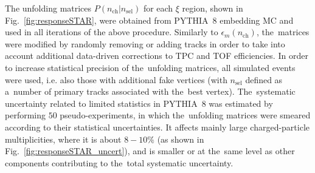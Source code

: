 The  unfolding matrices $P(n_\textrm{ch}|n_\textrm{sel})$  for each $\xi$ region, shown in Fig.~\ref{fig:responseSTAR}, were obtained from PYTHIA~8 embedding MC and used in all iterations of the above procedure. Similarly to $\epsilon_m(n_\textrm{ch})$, the~matrices were modified by randomly removing or adding tracks in order to take into account additional data-driven corrections to TPC and TOF efficiencies. In order to  increase statistical precision of the~unfolding matrices,   all simulated events were used, i.e. also those with additional fake vertices (with $n_\textrm{sel}$ defined as a~number of primary tracks associated with the~best vertex).
The~systematic uncertainty related to limited statistics in PYTHIA~8 was estimated by performing $50$ pseudo-experiments, in which the~unfolding matrices were smeared according to their statistical uncertainties.
It affects mainly large charged-particle multiplicities, where it is about $8-10\%$ (as shown in Fig.~\ref{fig:responseSTAR_uncert}), and is smaller or at the~same level as  other components contributing  to the~total systematic uncertainty.


